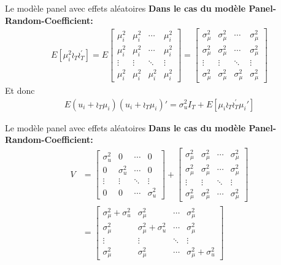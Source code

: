 \documentclass{beamer}
\begin{document}
\begin{frame}{Le modèle panel avec effets aléatoires}
\textbf{Dans le cas du modèle Panel-Random-Coefficient:}
\begin{align*}
E[\mu_i^2 \wr_T \wr_T^{'}] = E \begin{bmatrix} 
\mu_i^2 & \mu_i^2 & \cdots & \mu_i^2\\
\mu_i^2 & \mu_i^2 & \cdots & \mu_i^2\\
\vdots & \vdots & \ddots & \vdots \\
\mu_i^2 & \mu_i^2 & \mu_i^2 & \mu_i^2
\end{bmatrix}=
\begin{bmatrix} 
\sigma_{\mu}^2 & \sigma_{\mu}^2 & \cdots & \sigma_{\mu}^2\\
\sigma_{\mu}^2 & \sigma_{\mu}^2 & \cdots & \sigma_{\mu}^2\\
\vdots & \vdots & \ddots & \vdots \\
\sigma_{\mu}^2 & \sigma_{\mu}^2 & \sigma_{\mu}^2 & \sigma_{\mu}^2
\end{bmatrix}
\end{align*}
Et donc 
\begin{align*}
E(u_i+\wr_T \mu_i)(u_i+\wr_T \mu_i)'=\sigma_u^2 I_T+E[\mu_i \wr_T \wr_T^{'}\mu_i{'}]
\end{align*}
\end{frame}

\begin{frame}{Le modèle panel avec effets aléatoires}
\textbf{Dans le cas du modèle Panel-Random-Coefficient:}
\begin{align*}
V & =\begin{bmatrix} 
\sigma_{u}^2 & 0 & \cdots & 0\\
0 & \sigma_{u}^2 & \cdots & 0\\
\vdots & \vdots & \ddots & \vdots \\
0 & 0 & \cdots & \sigma_{u}^2
\end{bmatrix}+
\begin{bmatrix} 
\sigma_{\mu}^2 & \sigma_{\mu}^2 & \cdots & \sigma_{\mu}^2\\
\sigma_{\mu}^2 & \sigma_{\mu}^2 & \cdots & \sigma_{\mu}^2\\
\vdots & \vdots & \ddots & \vdots \\
\sigma_{\mu}^2 & \sigma_{\mu}^2 & \cdots & \sigma_{\mu}^2
\end{bmatrix} \\ & =
\begin{bmatrix} 
\sigma_{\mu}^2+\sigma_{u}^2 & \sigma_{\mu}^2 & \cdots & \sigma_{\mu}^2\\
\sigma_{\mu}^2 & \sigma_{\mu}^2+\sigma_{u}^2 & \cdots & \sigma_{\mu}^2\\
\vdots & \vdots & \ddots & \vdots \\
\sigma_{\mu}^2 & \sigma_{\mu}^2 & \cdots & \sigma_{\mu}^2+\sigma_{u}^2
\end{bmatrix}
\end{align*}
\end{frame}
\end{document}
